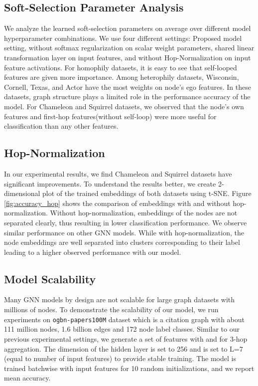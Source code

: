 \documentclass[sigconf,natbib=false]{acmart}
\begin{document}
\subsection{Soft-Selection Parameter Analysis}


We analyze the learned soft-selection parameters on average over different model hyperparameter combinations. We use four different settings: Proposed model setting, without softmax regularization on scalar weight parameters, shared linear transformation layer on input features, and without Hop-Normalization on input feature activations.  For homophily datasets, it is easy to see that self-looped features are given more importance. Among heterophily datasets, Wisconsin, Cornell, Texas, and Actor have the most weights on node's ego features. In these datasets, graph structure plays a limited role in the performance accuracy of the model. For Chameleon and Squirrel datasets, we observed that the node's own features and first-hop features(without self-loop) were more useful for classification than any other features.



\subsection{Hop-Normalization}

In our experimental results, we find Chameleon and Squirrel datasets have significant improvements. To understand the results better, we create 2-dimensional plot of the trained embeddings of both datasets using t-SNE\cite{maaten_accelerating_2014}. Figure \ref{fig:accuracy_hop} shows the comparison of embeddings with and without hop-normalization. Without hop-normalization, embeddings of the nodes are not separated clearly, thus resulting in lower classification performance. We observe similar performance on other GNN models. While with hop-normalization, the node embeddings are well separated into clusters corresponding to their label leading to a higher observed performance with our model. 


\subsection{Model Scalability}

Many GNN models by design are not scalable for large graph datasets with millions of nodes. 
To demonstrate the scalability of our model, we run experiments on \texttt{ogbn-papers100M} dataset \cite{wang_microsoft_2020}\cite{hu_open_2021} which is a citation graph with about 111 million nodes, 1.6 billion edges and 172 node label classes. Similar to our previous experimental settings, we generate a set of features with  and  for 3-hop aggregation. The dimension of the hidden layer is set to 256 and  is set to L=7 (equal to number of input features) to provide stable training. The model is trained batchwise with input features for 10 random initializations, and we report mean accuracy.
\end{document}
